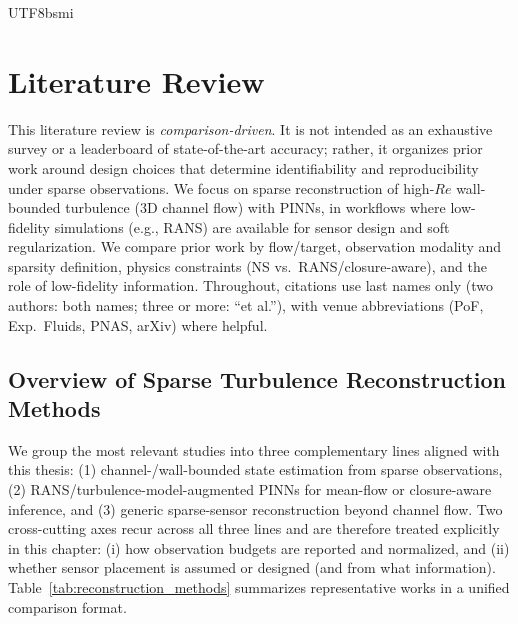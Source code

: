 \documentclass[master]{NTHUthesis}
\begin{document}
\begin{CJK*}{UTF8}{bsmi}
\section{Literature Review}
\label{sec:literature_review}

This literature review is \emph{comparison-driven}. It is not intended as an exhaustive survey or a leaderboard of state-of-the-art accuracy; rather, it organizes prior work around design choices that determine identifiability and reproducibility under sparse observations. We focus on sparse reconstruction of high-$Re$ wall-bounded turbulence (3D channel flow) with PINNs, in workflows where low-fidelity simulations (e.g., RANS) are available for sensor design and soft regularization. We compare prior work by flow/target, observation modality and sparsity definition, physics constraints (NS vs.\ RANS/closure-aware), and the role of low-fidelity information. Throughout, citations use last names only (two authors: both names; three or more: ``et al.''), with venue abbreviations (PoF, Exp.\ Fluids, PNAS, arXiv) where helpful.

\subsection{Overview of Sparse Turbulence Reconstruction Methods}
\label{sec:literature_overview}

We group the most relevant studies into three complementary lines aligned with this thesis: (1) channel-/wall-bounded state estimation from sparse observations, (2) RANS/turbulence-model-augmented PINNs for mean-flow or closure-aware inference, and (3) generic sparse-sensor reconstruction beyond channel flow. Two cross-cutting axes recur across all three lines and are therefore treated explicitly in this chapter: (i) how observation budgets are reported and normalized, and (ii) whether sensor placement is assumed or designed (and from what information). Table~\ref{tab:reconstruction_methods} summarizes representative works in a unified comparison format.


\end{CJK*}
\end{document}
